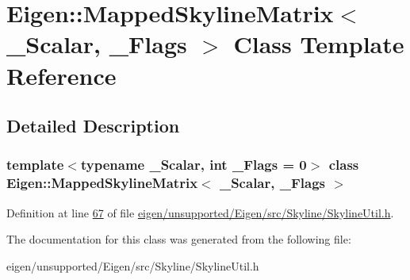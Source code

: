 \hypertarget{class_eigen_1_1_mapped_skyline_matrix}{}\section{Eigen\+:\+:Mapped\+Skyline\+Matrix$<$ \+\_\+\+Scalar, \+\_\+\+Flags $>$ Class Template Reference}
\label{class_eigen_1_1_mapped_skyline_matrix}


\subsection{Detailed Description}
\subsubsection*{template$<$typename \+\_\+\+Scalar, int \+\_\+\+Flags = 0$>$\newline
class Eigen\+::\+Mapped\+Skyline\+Matrix$<$ \+\_\+\+Scalar, \+\_\+\+Flags $>$}



Definition at line \hyperlink{eigen_2unsupported_2_eigen_2src_2_skyline_2_skyline_util_8h_source_l00067}{67} of file \hyperlink{eigen_2unsupported_2_eigen_2src_2_skyline_2_skyline_util_8h_source}{eigen/unsupported/\+Eigen/src/\+Skyline/\+Skyline\+Util.\+h}.



The documentation for this class was generated from the following file\+:\begin{DoxyCompactItemize}
\item 
eigen/unsupported/\+Eigen/src/\+Skyline/\+Skyline\+Util.\+h\end{DoxyCompactItemize}
